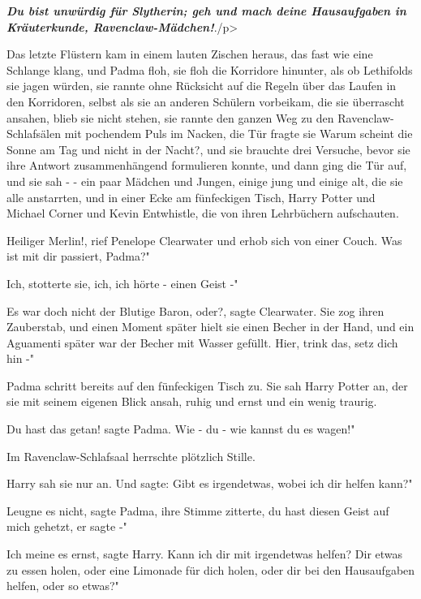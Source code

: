 \textbf{\emph{Du bist unwürdig für
Slytherin; geh und mach deine Hausaufgaben in Kräuterkunde,
Ravenclaw-Mädchen!}}\grqq{}./p>

Das letzte Flüstern kam in einem lauten Zischen heraus, das fast wie eine
Schlange klang, und Padma floh, sie floh die Korridore hinunter, als ob
Lethifolds sie jagen würden, sie rannte ohne Rücksicht auf die Regeln über das
Laufen in den Korridoren, selbst als sie an anderen Schülern vorbeikam, die sie
überrascht ansahen, blieb sie nicht stehen, sie rannte den ganzen Weg zu den
Ravenclaw-Schlafsälen mit pochendem Puls im Nacken, die Tür fragte sie \glqq
Warum scheint die Sonne am Tag und nicht in der Nacht?\grqq{}, und sie brauchte
drei Versuche, bevor sie ihre Antwort zusammenhängend formulieren konnte, und
dann ging die Tür auf, und sie sah - - ein paar Mädchen und Jungen, einige jung
und einige alt, die sie alle anstarrten, und in einer Ecke am fünfeckigen Tisch,
Harry Potter und Michael Corner und Kevin Entwhistle, die von ihren Lehrbüchern
aufschauten.

\glqq{}Heiliger Merlin!\grqq{}, rief Penelope Clearwater und erhob sich von einer
Couch. \glqq{}Was ist mit dir passiert, Padma?"

\glqq{}Ich\grqq{}, stotterte sie, \glqq{}ich, ich hörte - einen Geist -"

\glqq{}Es war doch nicht der Blutige Baron, oder?\grqq{}, sagte Clearwater. Sie
zog ihren Zauberstab, und einen Moment später hielt sie einen Becher in der
Hand, und ein Aguamenti später war der Becher mit Wasser gefüllt. \glqq{}Hier,
trink das, setz dich hin -"

Padma schritt bereits auf den fünfeckigen Tisch zu. Sie sah Harry Potter an, der
sie mit seinem eigenen Blick ansah, ruhig und ernst und ein wenig traurig.

\glqq{}Du hast das getan!\grqq{} sagte Padma. \glqq{}Wie - du - wie kannst du es
wagen!"

Im Ravenclaw-Schlafsaal herrschte plötzlich Stille.

Harry sah sie nur an. Und sagte: \glqq{}Gibt es irgendetwas, wobei ich dir helfen
kann?"

\glqq{}Leugne es nicht\grqq{}, sagte Padma, ihre Stimme zitterte, \glqq{}du hast
diesen Geist auf mich gehetzt, er sagte -"

\glqq{}Ich meine es ernst\grqq{}, sagte Harry. \glqq{}Kann ich dir mit irgendetwas
helfen? Dir etwas zu essen holen, oder eine Limonade für dich holen, oder dir
bei den Hausaufgaben helfen, oder so etwas?"

